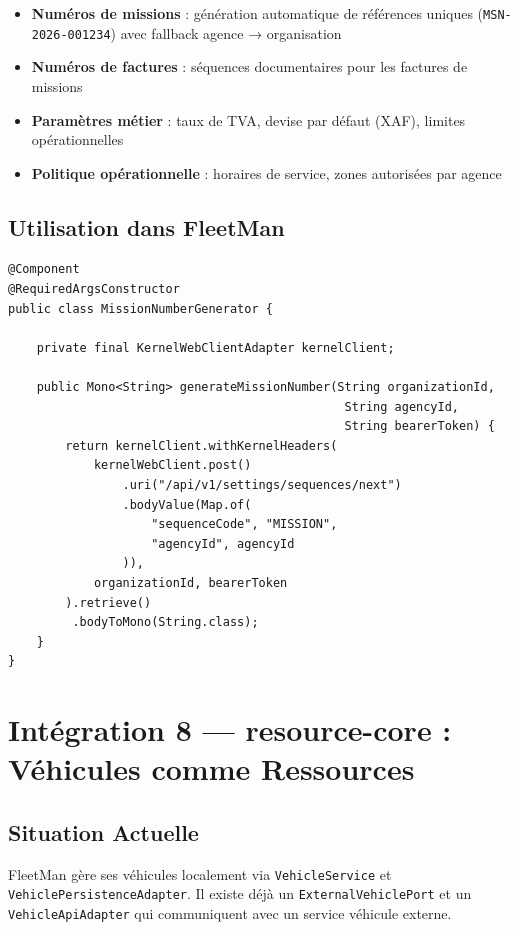 \documentclass[12pt,a4paper]{report}
\begin{document}
\begin{itemize}[leftmargin=2cm]
  \item \textbf{Numéros de missions} : génération automatique de références uniques (\texttt{MSN-2026-001234}) avec fallback agence → organisation
  \item \textbf{Numéros de factures} : séquences documentaires pour les factures de missions
  \item \textbf{Paramètres métier} : taux de TVA, devise par défaut (XAF), limites opérationnelles
  \item \textbf{Politique opérationnelle} : horaires de service, zones autorisées par agence
\end{itemize}

\subsection{Utilisation dans FleetMan}

\begin{lstlisting}[style=javaStyle, caption={Appel au settings-core pour générer un numéro de mission}]
@Component
@RequiredArgsConstructor
public class MissionNumberGenerator {

    private final KernelWebClientAdapter kernelClient;

    public Mono<String> generateMissionNumber(String organizationId,
                                               String agencyId,
                                               String bearerToken) {
        return kernelClient.withKernelHeaders(
            kernelWebClient.post()
                .uri("/api/v1/settings/sequences/next")
                .bodyValue(Map.of(
                    "sequenceCode", "MISSION",
                    "agencyId", agencyId
                )),
            organizationId, bearerToken
        ).retrieve()
         .bodyToMono(String.class);
    }
}
\end{lstlisting}

\section{Intégration 8 — resource-core : Véhicules comme Ressources}

\subsection{Situation Actuelle}

FleetMan gère ses véhicules localement via \texttt{VehicleService} et \texttt{VehiclePersistenceAdapter}. Il existe déjà un \texttt{ExternalVehiclePort} et un \texttt{VehicleApiAdapter} qui communiquent avec un service véhicule externe.
\end{document}
